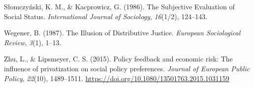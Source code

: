 \documentclass[
  12pt,
]{book}
\newlength{\cslhangindent}
\newenvironment{cslreferences}%
  {\setlength{\parindent}{0pt}%
  \everypar{\setlength{\hangindent}{\cslhangindent}}\ignorespaces}%
  {\par}
\begin{document}
\begin{cslreferences}
\leavevmode\hypertarget{ref-slomczynski1987}{}%
Słomczyński, K. M., \& Kacprowicz, G. (1986). The Subjective Evaluation of Social Status. \emph{International Journal of Sociology}, \emph{16}(1/2), 124--143.

\leavevmode\hypertarget{ref-wegener_illusion_1987}{}%
Wegener, B. (1987). The Illusion of Distributive Justice. \emph{European Sociological Review}, \emph{3}(1), 1--13.

\leavevmode\hypertarget{ref-zhu_policy_2015}{}%
Zhu, L., \& Lipsmeyer, C. S. (2015). Policy feedback and economic risk: The influence of privatization on social policy preferences. \emph{Journal of European Public Policy}, \emph{22}(10), 1489--1511. \url{https://doi.org/10.1080/13501763.2015.1031159}
\end{cslreferences}
\end{document}
